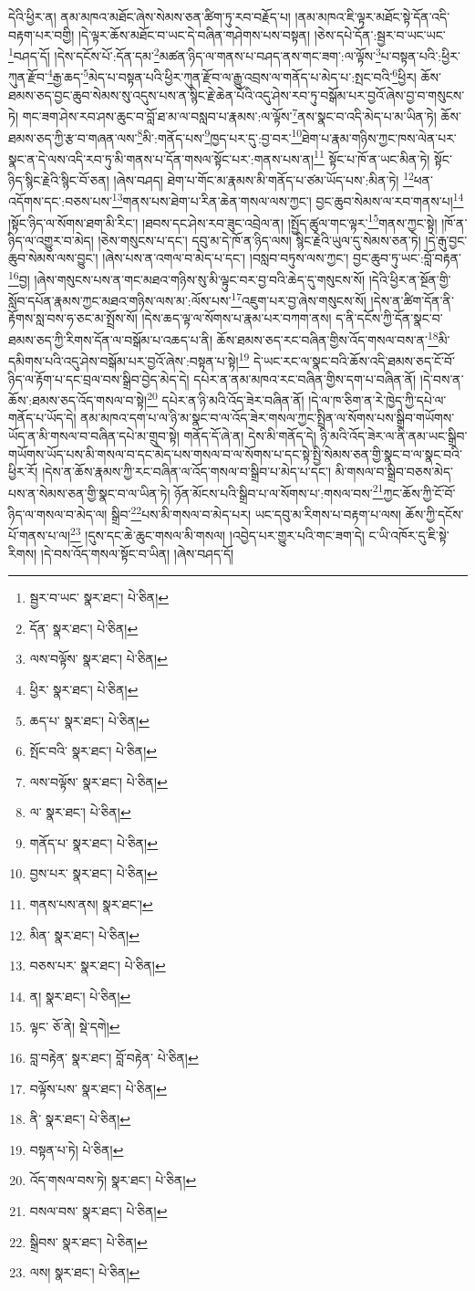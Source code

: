 དེའི་ཕྱིར་ན། ནམ་མཁའ་མཐོང་ཞེས་སེམས་ཅན་ཚིག་ཏུ་རབ་བརྗོད་པ། །ནམ་མཁའ་ཇི་ལྟར་མཐོང་སྟེ་དོན་འདི་བརྟག་པར་བགྱི། །དེ་ལྟར་ཆོས་མཐོང་བ་ཡང་དེ་བཞིན་གཤེགས་པས་བསྟན། །ཅེས་དཔེ་དོན་:སྦྱར་བ་ཡང་ཡང་\footnote{སྦྱར་བ་ཡང་  སྣར་ཐང་།  པེ་ཅིན། }བཤད་དོ། །དེས་དངོས་པོ་:དོན་དམ་\footnote{དོན་  སྣར་ཐང་།  པེ་ཅིན། }མཚན་ཉིད་ལ་གནས་པ་བཤད་ནས་གང་ཟག་:ལ་ལྟོས་\footnote{ལས་བལྟོས་  སྣར་ཐང་།  པེ་ཅིན། }པ་བསྟན་པའི་:ཕྱིར་ཀུན་རྫོབ་\footnote{ཕྱིར་  སྣར་ཐང་།  པེ་ཅིན། }རྒྱ་ཆད་\footnote{ཆད་པ་  སྣར་ཐང་།  པེ་ཅིན། }མེད་པ་བསྟན་པའི་ཕྱིར་ཀུན་རྫོབ་ལ་རྒྱུ་འབྲས་ལ་གནོད་པ་མེད་པ་:སྤང་བའི་\footnote{སྤོང་བའི་  སྣར་ཐང་།  པེ་ཅིན། }ཕྱིར། ཆོས་ཐམས་ཅད་བྱང་ཆུབ་སེམས་སུ་འདུས་པས་ན་སྙིང་རྗེ་ཆེན་པོའི་འདུ་ཤེས་རབ་ཏུ་བསྒོམ་པར་བྱའོ་ཞེས་བྱ་བ་གསུངས་ཏེ། གང་ཟག་ཤེས་རབ་ཤས་ཆུང་བ་བློ་ཐ་མ་ལ་བསླབ་པ་རྣམས་:ལ་ལྟོས་\footnote{ལས་བལྟོས་  སྣར་ཐང་།  པེ་ཅིན། }ནས་སྣང་བ་འདི་མེད་པ་མ་ཡིན་ཏེ། ཆོས་ཐམས་ཅད་ཀྱི་རྩ་བ་གཞན་ལས་\footnote{ལ་  སྣར་ཐང་།  པེ་ཅིན། }མི་:གནོད་པས་\footnote{གནོད་པ་  སྣར་ཐང་།  པེ་ཅིན། }ཁྱད་པར་དུ་:བྱ་བར་\footnote{བྱས་པར་  སྣར་ཐང་།  པེ་ཅིན། }ཐེག་པ་རྣམ་གཉིས་ཀྱང་ཁས་ལེན་པར་སྣང་ན་དེ་ལས་འདི་རབ་ཏུ་མི་གནས་པ་དོན་གསལ་སྟོང་པར་:གནས་པས་ན།\footnote{གནས་པས་ནས།  སྣར་ཐང་། } སྟོང་པ་ཁོ་ན་ཡང་མིན་ཏེ། སྟོང་ཉིད་སྙིང་རྗེའི་སྙིང་བོ་ཅན། །ཞེས་བཤད། ཐེག་པ་གོང་མ་རྣམས་མི་གནོད་པ་ཙམ་ཡོད་པས་:མིན་ཏེ། \footnote{མིན་  སྣར་ཐང་།  པེ་ཅིན། }ཕན་འདོགས་དང་:བཅས་པས་\footnote{བཅས་པར་  སྣར་ཐང་།  པེ་ཅིན། }གནས་པས་ཐེག་པ་རིན་ཆེན་གསལ་ལས་ཀྱང་། བྱང་ཆུབ་སེམས་ལ་རབ་གནས་པ།\footnote{ན།  སྣར་ཐང་།  པེ་ཅིན། } །སྟོང་ཉིད་ལ་སོགས་ཐག་མི་རིང་། །ཐབས་དང་ཤེས་རབ་ཟུང་འབྲེལ་ན། །སྤྱོད་ཚུལ་གང་ལྟར་\footnote{ལྟང་  ཅོ་ནེ།  སྡེ་དགེ། }གནས་ཀྱང་སྟེ། །ཁོ་ན་ཉིད་ལ་འགྱུར་བ་མེད། །ཅེས་གསུངས་པ་དང་། དབུ་མ་དེ་ཁོ་ན་ཉིད་ལས། སྙིང་རྗེའི་ཡུལ་དུ་སེམས་ཅན་ཏེ། །དེ་རྒུ་བྱང་ཆུབ་སེམས་ལས་བྱུང་། །ཞེས་པས་ན་འགལ་བ་མེད་པ་དང་། །བསླབ་བཏུས་ལས་ཀྱང་། བྱང་ཆུབ་ཏུ་ཡང་:བློ་བརྟན་\footnote{བླ་བརྟེན་  སྣར་ཐང་། བློ་བརྟེན་  པེ་ཅིན། }བྱ། །ཞེས་གསུངས་པས་ན་གང་མཐའ་གཉིས་སུ་མི་ལྟུང་བར་བྱ་བའི་ཆེད་དུ་གསུངས་སོ། །དེའི་ཕྱིར་ན་སྔོན་གྱི་སློབ་དཔོན་རྣམས་ཀྱང་མཐའ་གཉིས་ལས་མ་:ལོས་པས་\footnote{བལྟོས་པས་  སྣར་ཐང་།  པེ་ཅིན། }འཇུག་པར་བྱ་ཞེས་གསུངས་སོ། །དེས་ན་ཚིག་དོན་ནི་རྟོགས་སླ་བས་ཧ་ཅང་མ་སྤྲོས་སོ། །དེས་ཆད་ལྟ་ལ་སོགས་པ་རྣམ་པར་བཀག་ནས། ད་ནི་དངོས་ཀྱི་དོན་སྣང་བ་ཐམས་ཅད་ཀྱི་རིགས་དོན་ལ་བསྒོམ་པ་འཆད་པ་ནི། ཆོས་ཐམས་ཅད་རང་བཞིན་གྱིས་འོད་གསལ་བས་ན་\footnote{ནི་  སྣར་ཐང་།  པེ་ཅིན། }མི་དམིགས་པའི་འདུ་ཤེས་བསྒོམ་པར་བྱའོ་ཞེས་:བསྟན་པ་སྟེ།\footnote{བསྟན་པ་ཏེ།  པེ་ཅིན། } དེ་ཡང་རང་ལ་སྣང་བའི་ཆོས་འདི་ཐམས་ཅད་ངོ་བོ་ཉིད་ལ་རྟོག་པ་དང་བྲལ་བས་སྒྲིབ་བྱེད་མེད་དེ། དཔེར་ན་ནམ་མཁའ་རང་བཞིན་གྱིས་དག་པ་བཞིན་ནོ། །དེ་བས་ན་ཆོས་:ཐམས་ཅད་འོད་གསལ་བ་སྟེ།\footnote{འོད་གསལ་བས་ཏེ།  སྣར་ཐང་།  པེ་ཅིན། } དཔེར་ན་ཉི་མའི་འོད་ཟེར་བཞིན་ནོ། །དེ་ལ་ཁ་ཅིག་ན་རེ་ཁྱེད་ཀྱི་དཔེ་ལ་གནོད་པ་ཡོད་དེ། ནམ་མཁའ་དག་པ་ལ་ཉི་མ་སྣང་བ་ལ་འོད་ཟེར་གསལ་ཀྱང་སྤྲིན་ལ་སོགས་པས་སྒྲིབ་གཡོགས་ཡོད་ན་མི་གསལ་བ་བཞིན་དཔེ་མ་གྲུབ་སྟེ། གནོད་དོ་ཞེ་ན། དེས་མི་གནོད་དེ། ཉི་མའི་འོད་ཟེར་ལ་ནི་ནམ་ཡང་སྒྲིབ་གཡོགས་ཡོད་པས་མི་གསལ་བ་དང་མེད་པས་གསལ་བ་ལ་སོགས་པ་དང་སྟེ་སྤྱི་སེམས་ཅན་གྱི་སྣང་བ་ལ་སྣང་བའི་ཕྱིར་རོ། །དེས་ན་ཆོས་རྣམས་ཀྱི་རང་བཞིན་ལ་འོད་གསལ་བ་སྒྲིབ་པ་མེད་པ་དང་། མི་གསལ་བ་སྒྲིབ་བཅས་མེད་པས་ན་སེམས་ཅན་གྱི་སྣང་བ་ལ་ཡིན་ཏེ། ཉོན་མོངས་པའི་སྒྲིབ་པ་ལ་སོགས་པ་:གསལ་བས་\footnote{བསལ་བས་  སྣར་ཐང་།  པེ་ཅིན། }ཀྱང་ཆོས་ཀྱི་ངོ་བོ་ཉིད་ལ་གསལ་བ་མེད་ལ། སྒྲིབ་\footnote{སྒྲིབས་  སྣར་ཐང་།  པེ་ཅིན། }པས་མི་གསལ་བ་མེད་པར། ཡང་དབུ་མ་རིགས་པ་བརྟག་པ་ལས། ཆོས་ཀྱི་དངོས་པོ་གནས་པ་ལ།\footnote{ལས།  སྣར་ཐང་།  པེ་ཅིན། } །དུས་དང་ཆེ་ཆུང་གསལ་མི་གསལ། །འབྱེད་པར་གྱུར་པའི་གང་ཟག་དེ། ང་ཡི་འཁོར་དུ་ཇི་སྟེ་རིགས། །དེ་བས་འོད་གསལ་སྟོང་བ་ཡིན། །ཞེས་བཤད་དོ། 